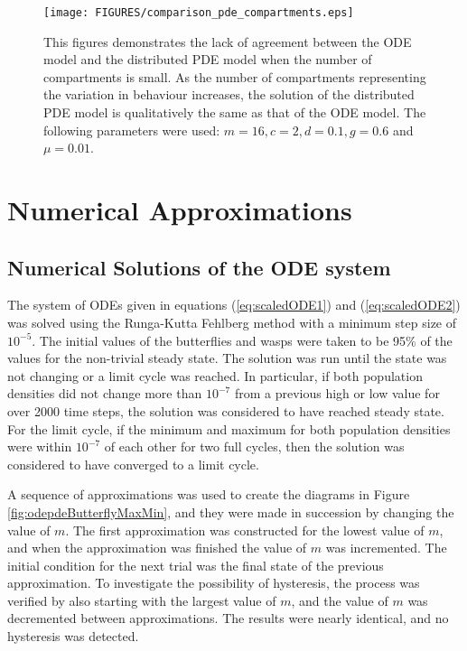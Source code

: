 \documentclass[review,authoryear]{elsarticle}
\newcommand{\origM}{m}
\begin{document}
\begin{figure}[!htp]
\begin{center}
\texttt{[image: FIGURES/comparison\_pde\_compartments.eps]} 
\end{center}
\caption{This figures demonstrates the lack of agreement between the ODE model and the distributed PDE model when the number of compartments is small. As the number of compartments representing the variation in behaviour increases, the solution of the distributed PDE model is qualitatively the same as that of the ODE model. The following parameters were used: $m=16, c=2, d=0.1, g=0.6$ and $\mu=0.01$. }
\label{fig:comparisonDistributedCompartments}
\end{figure}
\section{Numerical Approximations}
\label{numericalApproximationODE}
\subsection{Numerical Solutions of the ODE system}
The system of ODEs given in
equations (\ref{eq:scaledODE1}) and (\ref{eq:scaledODE2}) was
solved using the Runga-Kutta Fehlberg method with a minimum step
size of $10^{-5}$. 
The initial values of the butterflies and wasps
were taken to be 95\% of the values for the non-trivial steady state. The
solution was run until the state was not changing or
a limit cycle was reached. In particular, if both population densities did not
change more than $10^{-7}$ from a previous high or low value for over
2000 time steps, the solution was considered to have reached steady state. For the
limit cycle, if the minimum and maximum for both population densities were within
$10^{-7}$ of each other for two full cycles, then the solution was considered to have converged to a limit
cycle.

A sequence of approximations was used to create the diagrams in Figure \ref{fig:odepdeButterflyMaxMin}, and they were made in succession by changing the value of $\origM$. The first approximation was constructed for the lowest value of $\origM$, and when the approximation was finished the value of $\origM$ was incremented. The initial condition for the next trial was the final state of the previous approximation. To investigate the possibility of hysteresis, the process was verified by also starting with the largest value of $\origM$, and the value of $\origM$ was decremented between approximations.    The results were nearly
identical, and no hysteresis was detected.
\end{document}
